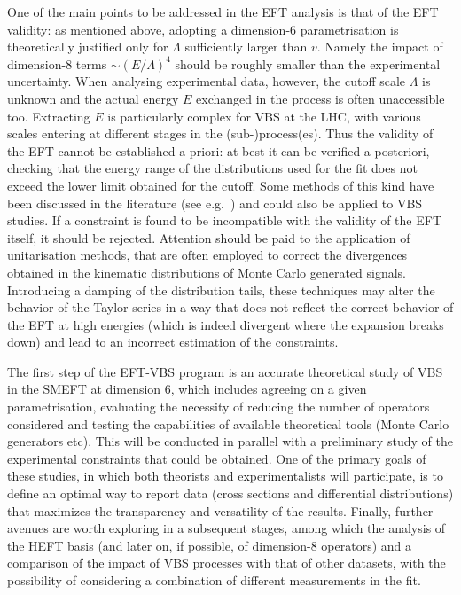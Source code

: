 One of the main points to be addressed in the EFT analysis is that of the EFT validity: as mentioned above, adopting a dimension-6 parametrisation is theoretically justified only for $\Lambda$ sufficiently larger than $v$. Namely the impact of dimension-8 terms $\sim (E/\Lambda)^4$ should be roughly smaller than the experimental uncertainty. When analysing experimental data, however, the cutoff scale $\Lambda$ is unknown and the actual energy $E$ exchanged in the process is often unaccessible too. Extracting $E$ is particularly complex for VBS at the LHC, with various scales entering at different stages in the (sub-)process(es).
Thus the validity of the EFT cannot be established a priori: at best it can be verified a posteriori, checking that the energy range of the distributions used for the fit does not exceed the lower limit obtained for the cutoff. Some methods of this kind have been discussed in the literature (see e.g.~\cite{Busoni:2013lha,Buchmueller:2013dya,Biekoetter:2014jwa,Englert:2014cva,Racco:2015dxa,Contino:2016jqw,Brivio:2017ije}) and could also be applied to VBS studies.
If a constraint is found to be incompatible with the validity of the EFT itself, it should be rejected.
Attention should be paid to the application of unitarisation methods, that are often employed to correct the divergences obtained in the kinematic distributions of Monte Carlo generated signals. Introducing a damping of the distribution tails, these techniques may alter the behavior of the Taylor series in a way that does not reflect the correct behavior of the EFT at high energies (which is indeed divergent where the expansion breaks down) and lead to an incorrect estimation of the constraints.

The first step of the EFT-VBS program is an accurate theoretical study of VBS in the SMEFT at dimension 6, which includes agreeing on a given parametrisation, evaluating the necessity of reducing the number of operators considered and testing the capabilities of available theoretical tools (Monte Carlo generators etc).
This will be conducted in parallel with a preliminary study of the experimental constraints that could be obtained. One of the primary goals of these studies, in which both theorists and experimentalists will participate, is to define an optimal way to report data (cross sections and differential distributions) that maximizes the transparency and versatility of the results.
Finally, further avenues are worth exploring in a subsequent stages, among which the analysis of the HEFT basis (and later on, if possible, of dimension-8 operators) and a comparison of the impact of VBS processes with that of other datasets, with the possibility of considering a combination of different measurements in the fit.



